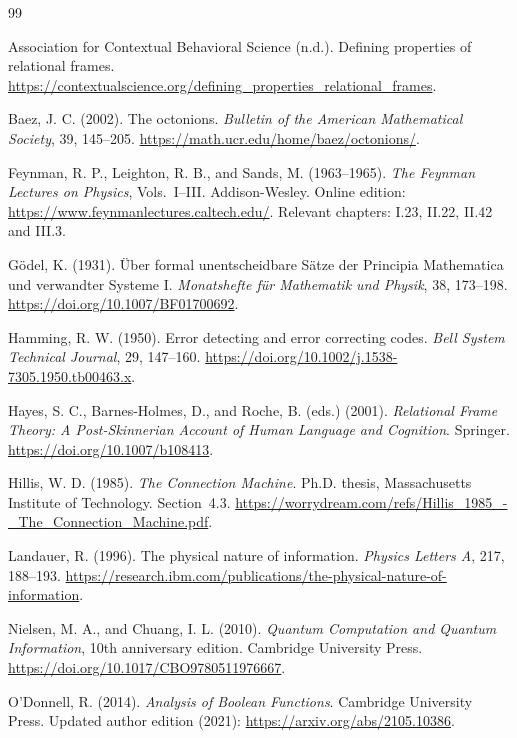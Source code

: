 \documentclass[11pt,a4paper]{article}
\theoremstyle{definition}
\begin{document}
\begin{thebibliography}{99}

Association for Contextual Behavioral Science (n.d.).
Defining properties of relational frames.
\url{https://contextualscience.org/defining_properties_relational_frames}.

Baez, J. C. (2002). The octonions.
\emph{Bulletin of the American Mathematical Society}, 39, 145--205.
\url{https://math.ucr.edu/home/baez/octonions/}.

Feynman, R. P., Leighton, R. B., and Sands, M. (1963--1965).
\emph{The Feynman Lectures on Physics}, Vols.~I--III. Addison-Wesley.
Online edition: \url{https://www.feynmanlectures.caltech.edu/}.
Relevant chapters: I.23, II.22, II.42 and III.3.

G\"odel, K. (1931). \"Uber formal unentscheidbare S\"atze der
Principia Mathematica und verwandter Systeme I.
\emph{Monatshefte f\"ur Mathematik und Physik}, 38, 173--198.
\url{https://doi.org/10.1007/BF01700692}.

Hamming, R. W. (1950). Error detecting and error correcting codes.
\emph{Bell System Technical Journal}, 29, 147--160.
\url{https://doi.org/10.1002/j.1538-7305.1950.tb00463.x}.

Hayes, S. C., Barnes-Holmes, D., and Roche, B. (eds.) (2001).
\emph{Relational Frame Theory: A Post-Skinnerian Account of Human
Language and Cognition}. Springer.
\url{https://doi.org/10.1007/b108413}.

Hillis, W. D. (1985). \emph{The Connection Machine}.
Ph.D. thesis, Massachusetts Institute of Technology. Section~4.3.
\url{https://worrydream.com/refs/Hillis_1985_-_The_Connection_Machine.pdf}.

Landauer, R. (1996). The physical nature of information.
\emph{Physics Letters A}, 217, 188--193.
\url{https://research.ibm.com/publications/the-physical-nature-of-information}.

Nielsen, M. A., and Chuang, I. L. (2010).
\emph{Quantum Computation and Quantum Information}, 10th anniversary
edition. Cambridge University Press.
\url{https://doi.org/10.1017/CBO9780511976667}.

O'Donnell, R. (2014). \emph{Analysis of Boolean Functions}.
Cambridge University Press. Updated author edition (2021):
\url{https://arxiv.org/abs/2105.10386}.


\end{thebibliography}
\end{document}
